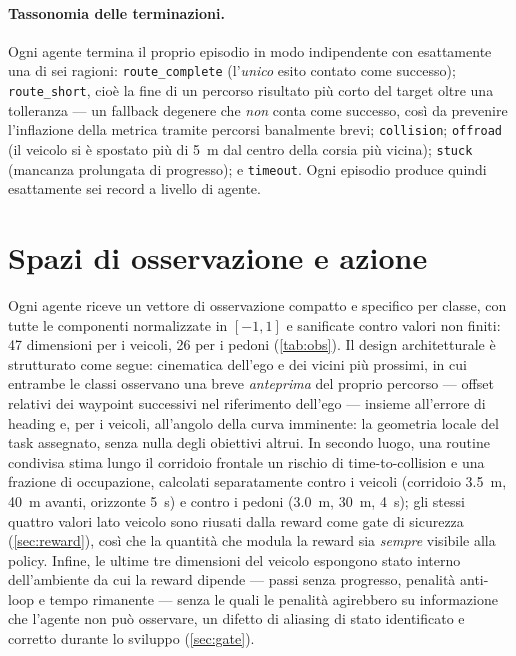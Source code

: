 \paragraph{Tassonomia delle terminazioni.}
Ogni agente termina il proprio episodio in modo indipendente con
esattamente una di sei ragioni: \texttt{route\_complete} (l'\emph{unico}
esito contato come successo); \texttt{route\_short}, cioè la fine di un
percorso risultato più corto del target oltre una tolleranza --- un
fallback degenere che \emph{non} conta come successo, così da prevenire
l'inflazione della metrica tramite percorsi banalmente brevi;
\texttt{collision}; \texttt{offroad} (il veicolo si è spostato più di
\SI{5}{m} dal centro della corsia più vicina); \texttt{stuck} (mancanza
prolungata di progresso); e \texttt{timeout}. Ogni episodio produce
quindi esattamente sei record a livello di agente.

\section{Spazi di osservazione e azione}
\label{sec:osservazioni}

Ogni agente riceve un vettore di osservazione compatto e specifico per
classe, con tutte le componenti normalizzate in $[-1,1]$ e sanificate
contro valori non finiti: 47 dimensioni per i veicoli, 26 per i pedoni
(\cref{tab:obs}). Il design architetturale è strutturato come segue:
cinematica dell'ego e dei vicini più prossimi, in cui entrambe le
classi osservano una breve \emph{anteprima} del proprio percorso ---
offset relativi dei waypoint successivi nel riferimento dell'ego ---
insieme all'errore di heading e, per i veicoli, all'angolo della curva
imminente: la geometria locale del task assegnato, senza nulla degli
obiettivi altrui. In secondo luogo, una routine condivisa stima lungo il
corridoio frontale un rischio di time-to-collision e una frazione di
occupazione, calcolati separatamente contro i veicoli (corridoio
\SI{3.5}{m}, \SI{40}{m} avanti, orizzonte \SI{5}{s}) e contro i pedoni
(\SI{3.0}{m}, \SI{30}{m}, \SI{4}{s}); gli stessi quattro valori lato
veicolo sono riusati dalla reward come gate di sicurezza
(\cref{sec:reward}), così che la quantità che modula la reward sia
\emph{sempre} visibile alla policy. Infine, le ultime tre dimensioni del
veicolo espongono stato interno dell'ambiente da cui la reward dipende
--- passi senza progresso, penalità anti-loop e tempo rimanente ---
senza le quali le penalità agirebbero su informazione che l'agente non
può osservare, un difetto di aliasing di stato identificato e corretto
durante lo sviluppo (\cref{sec:gate}).

